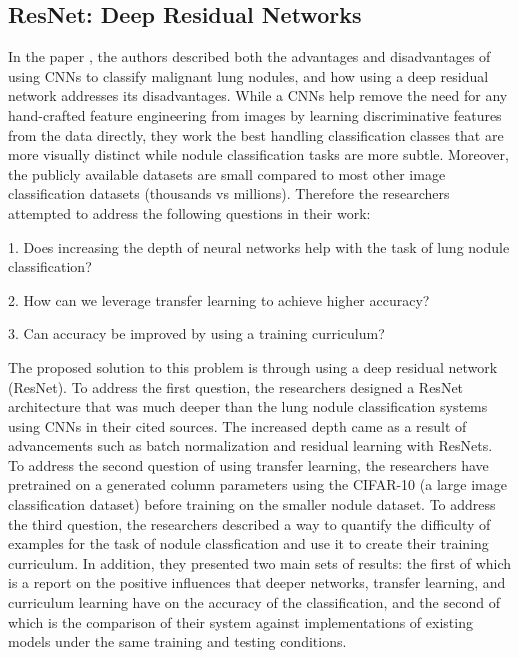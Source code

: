 \documentclass[10pt,twocolumn,letterpaper]{article}
\begin{document}
   \subsection{ResNet: Deep Residual Networks} \label{sec:related-deep-residual-networks}
      In the paper \cite{deep_residual_network}, the authors described both the advantages and disadvantages of using
      CNNs to classify malignant lung nodules, and how using a deep residual network addresses its disadvantages.
      While a CNNs help remove the need for any hand-crafted feature engineering from images by learning discriminative
      features from the data directly, they work the best handling classification classes that are more visually distinct
      while nodule classification tasks are more subtle. Moreover, the publicly available datasets are small compared to
      most other image classification datasets (thousands vs millions). Therefore the researchers attempted to address
      the following questions in their work:

      1. Does increasing the depth of neural networks help with the task of lung nodule classification?
    
      2. How can we leverage transfer learning to achieve higher accuracy?
    
      3. Can accuracy be improved by using a training curriculum?
    
      The proposed solution to this problem is through using a deep residual network (ResNet). To address the first question,
      the researchers designed a ResNet architecture that was much deeper than the lung nodule classification systems
      using CNNs in their cited sources. The increased depth came as a result of advancements such as batch normalization
      and residual learning with ResNets. To address the second question of using transfer learning, the researchers
      have pretrained on a generated column parameters using the CIFAR-10 (a large image classification dataset) before
      training on the smaller nodule dataset. To address the third question, the researchers described a way to quantify the
      difficulty of examples for the task of nodule classfication and use it to create their training curriculum. In addition,
      they presented two main sets of results: the first of which is a report on the positive influences that deeper networks, transfer learning, and curriculum
      learning have on the accuracy of the classification, and the second of which is the comparison of their system
      against implementations of existing models under the same training and testing conditions.
    
\end{document}
